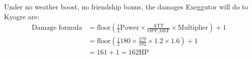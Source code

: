 \documentclass[12pt]{beamer}
\begin{document}
\begin{frame}
\begin{block}{}
\begin{footnotesize}
Under no weather boost, no friendship bonus, the damages Exeggutor will do to Kyogre are:
\begin{align*}
\text{Damage formula} & = \text{floor}\left(\frac{1}{2}\text{Power} \times \frac{\text{ATT}}{\text{OPP\_DEF}}\times\text{Multiplier}\right) +1  \\
& = \text{floor}\left(\frac{1}{2}\text{180} \times \frac{\text{179}}{\text{192}}\times\text{1.2}\times\text{1.6}\right) +1 \\
& = 161 + 1 = 162 \text{HP}
\end{align*}


\end{footnotesize}
\end{block}
\end{frame}
\end{document}
